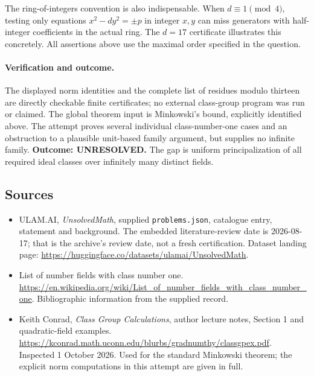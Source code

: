 \documentclass[11pt,a4paper]{article}
\begin{document}
The ring-of-integers convention is also indispensable. When
$d\equiv1\pmod4$, testing only equations $x^2-dy^2=\pm p$ in
integer $x,y$ can miss generators with half-integer coefficients in the
actual ring. The $d=17$ certificate illustrates this concretely.
All assertions above use the maximal order specified in the question.

\paragraph{Verification and outcome.}
The displayed norm identities and the complete list of residues modulo
thirteen are directly checkable finite certificates; no external
class-group program was run or claimed. The global theorem input is
Minkowski's bound, explicitly identified above. The attempt proves
several individual class-number-one cases and an obstruction to a
plausible unit-based family argument, but supplies no infinite family.
\textbf{Outcome: UNRESOLVED.} The gap is uniform principalization of
all required ideal classes over infinitely many distinct fields.

\subsection{Sources}

{\small

\begin{itemize}

\item[\hypertarget{source:statement:1}{S1}] ULAM.AI, \emph{UnsolvedMath}, supplied \texttt{problems.json}, catalogue entry, statement and background. The embedded literature-review date is 2026-08-17; that is the archive’s review date, not a fresh certification. Dataset landing page: \url{https://huggingface.co/datasets/ulamai/UnsolvedMath}.

\item[\hypertarget{source:statement:2}{S2}] List of number fields with class number one. \url{https://en.wikipedia.org/wiki/List_of_number_fields_with_class_number_one}. Bibliographic information from the supplied record.


\item[E1] Keith Conrad, \emph{Class Group Calculations},
author lecture notes, Section 1 and quadratic-field examples.
\url{https://kconrad.math.uconn.edu/blurbs/gradnumthy/classgpex.pdf}.
Inspected 1 October 2026. Used for the standard Minkowski theorem;
the explicit norm computations in this attempt are given in full.

\end{itemize}

}

\label{end:statement}
\end{document}
